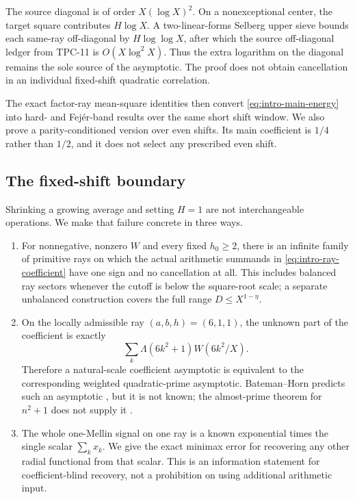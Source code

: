 The source diagonal is of order $X(\log X)^2$.  On a nonexceptional
center, the target square contributes $H\log X$.  A two-linear-forms
Selberg upper sieve bounds each same-ray off-diagonal by
$H\log\log X$, after which the source off-diagonal ledger from TPC-11 is
$O(X\log^2X)$.  Thus the extra logarithm on the diagonal remains the sole
source of the asymptotic.  The proof does not obtain cancellation in an
individual fixed-shift quadratic correlation.

The exact factor-ray mean-square identities then convert
\eqref{eq:intro-main-energy} into hard- and Fej\'er-band results over the
same short shift window.  We also prove a parity-conditioned version over
even shifts.  Its main coefficient is $1/4$ rather than $1/2$, and it
does not select any prescribed even shift.

\subsection{The fixed-shift boundary}

Shrinking a growing average and setting $H=1$ are not interchangeable
operations.  We make that failure concrete in three ways.

\begin{enumerate}[label=\textup{(\roman*)}]
 \item For nonnegative, nonzero $W$ and every fixed $h_0\geq2$, there is
 an infinite family of
 primitive rays on which the actual arithmetic summands in
 \eqref{eq:intro-ray-coefficient} have one sign and no cancellation at
 all.  This includes balanced ray sectors whenever the cutoff is below
 the square-root scale; a separate unbalanced construction covers the
 full range $D\leq X^{1-\eta}$.

 \item On the locally admissible ray $(a,b,h)=(6,1,1)$, the unknown part
 of the coefficient is exactly
 \[
  \sum_k\Lambda(6k^2+1)W(6k^2/X).
 \]
 Therefore a natural-scale coefficient asymptotic is equivalent to the
 corresponding weighted quadratic-prime asymptotic.  Bateman--Horn
 predicts such an asymptotic \citep{BatemanHorn1962}, but it is not known;
 the almost-prime theorem for $n^2+1$ does not supply it
 \citep{Iwaniec1978}.

 \item The whole one-Mellin signal on one ray is a known exponential
 times the single scalar $\sum_kx_k$.  We give the exact minimax error for
 recovering any other radial functional from that scalar.  This is an
 information statement for coefficient-blind recovery, not a prohibition
 on using additional arithmetic input.
\end{enumerate}

